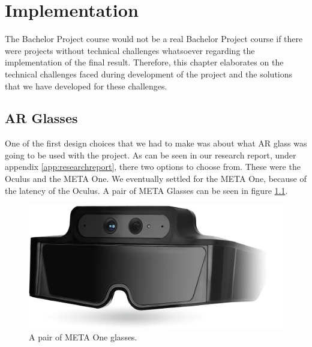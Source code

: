 \chapter{Implementation} \label{cha:implementation}
	The Bachelor Project course would not be a real Bachelor Project course if 
	there were projects without technical challenges whatsoever regarding the 
	implementation of the final result. Therefore, this chapter elaborates
	on the technical challenges faced during development of the project and
	the solutions that we have developed for these challenges.
	
	\section{AR Glasses} \label{sec:arglasses}
		One of the first design choices that we had to make was about what
		AR glass was going to be used with the project. As can be seen in
		our research report, under appendix \ref{app:researchreport},
		there two options to choose from. These were the Oculus and
		the META One. We eventually settled for the META One, because
		of the latency of the Oculus. A pair of META Glasses can be seen in
		figure \ref{fig:metaone}.
		
		\begin{figure}[!ht]
			\centering
			\includegraphics[width=\textwidth]{MetaOneGlasses}
			\caption{A pair of META One glasses.}
			\label{fig:metaone}
		\end{figure}
		
